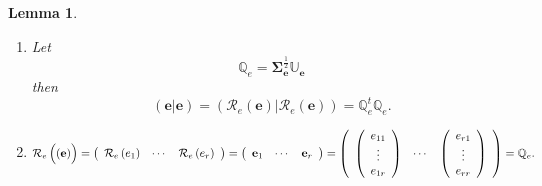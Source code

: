 \documentclass[aps,preprint]{revtex4}%
\newtheorem{lemma}[theorem]{Lemma}
\begin{document}
\begin{lemma}
\begin{enumerate}
\item Let
\begin{equation}
\mathbb{Q}_{e}=\mathbf{\Sigma}_{\mathbf{e}}^{\frac{1}{2}}\mathbb{U}%
_{\mathbf{e}}%
\end{equation}
then
\begin{equation}
\left(  \left.  \mathbf{e}\right\vert \mathbf{e}\right)  =\left(  \left.
\mathcal{R}_{e}\left(  \mathbf{e}\right)  \right\vert \mathcal{R}_{e}\left(
\mathbf{e}\right)  \right)  =\mathbb{Q}_{e}^{t}\mathbb{Q}_{e}.
\end{equation}


\item
\begin{equation}
\mathcal{R}_{e}\left(  \overset{}{\left(  \mathbf{e}\right)  }\right)
=\left(
\begin{array}
[c]{ccc}%
\mathcal{R}_{e}\left(  e_{1}\right)  & \cdots & \mathcal{R}_{e}\left(
e_{r}\right)
\end{array}
\right)  =\left(
\begin{array}
[c]{ccc}%
\mathbf{e}_{1} & \cdots & \mathbf{e}_{r}%
\end{array}
\right)  =\left(
\begin{array}
[c]{ccc}%
\left(
\begin{array}
[c]{c}%
e_{11}\\
\vdots\\
e_{1r}%
\end{array}
\right)  & \cdots & \left(
\begin{array}
[c]{c}%
e_{r1}\\
\vdots\\
e_{rr}%
\end{array}
\right)
\end{array}
\right)  =\mathbb{Q}_{e}.
\end{equation}



\end{enumerate}
\end{lemma}
\end{document}
